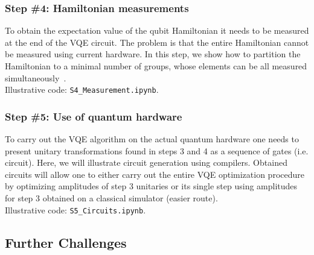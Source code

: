 \documentclass[12pt]{article}
\begin{document}
\subsubsection*{Step \#4: Hamiltonian measurements}

To obtain the expectation value of the qubit Hamiltonian it needs to be measured at the end of the VQE circuit. 
The problem is that the entire Hamiltonian cannot be measured using current hardware. 
In this step, we show how to partition the Hamiltonian to a minimal number of groups, whose elements can be all measured simultaneously~\cite{Verteletskyi:2020do,Yen2019b}.\\ 

Illustrative code: \texttt{S4\_Measurement.ipynb}.

\subsubsection*{Step \#5: Use of quantum hardware}

To carry out the VQE algorithm on the actual quantum hardware one needs to present unitary transformations found in steps 3 and 4 as a 
sequence of gates (i.e. circuit).  Here, we will illustrate circuit generation using compilers. Obtained circuits will allow one to either carry out 
the entire VQE optimization procedure by optimizing amplitudes of step 3 unitaries or its single step using amplitudes for step 3 obtained on a 
classical simulator (easier route). \\  

Illustrative code: \texttt{S5\_Circuits.ipynb}.

\subsection*{Further Challenges} \label{sec:challenges}
\end{document}

